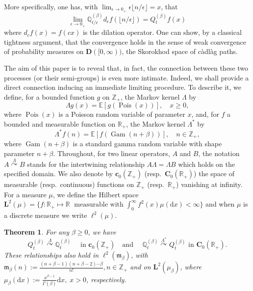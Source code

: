\documentclass[10pt]{amsart}
\newtheorem{theo}{Theorem}[section]
\theoremstyle{definition}\newtheorem{defi}[theo]{Definition}\newtheorem{rema}[theo]{Remark}\newtheorem{exam}[theo]{Example}\newtheorem{exem}[theo]{Example}\newtheorem{nota}[theo]{Notation}
\DeclareMathOperator{\Pois}{Pois}
\DeclareMathOperator{\Gam}{Gam}
\newcommand{\df}{\mathrel{:=}}
\newcommand{\EE}{\mathbb{E}}
\newcommand{\RR}{\mathbb{R}}
\newcommand{\ZZ}{\mathbb{Z}}
\newcommand{\fm}{\mathfrak{m}}
\newcommand{\esL}{\mathbf{L}}
\newcommand{\esC}{\mathbf{C}}
\newcommand{\esc}{\mathbf{c}}
\newcommand*\E{{\mathbb E}}
\newcommand*\R{{\mathbb R}}
\newcommand{\discret}[1]{\mathds{#1}}
\newcommand{\cont}[1]{{#1}}
\newcommand{\adjL}{\Lambda^*}
\newcommand{\Gate}[3]{#1\stackrel{#2}{\curvearrowright}#3}
\newcommand*{\dd}{\mathrm{d}}
\newcommand*{\dx}{\dd x}
\begin{document}
More specifically, one has, with $\lim_{\epsilon \to 0_+} \epsilon{\lfloor n/\epsilon \rfloor}=x$, that
\[
\lim_{\epsilon\to 0_+}\discret{Q}_{t/\epsilon}^{(\beta)} \cont{d}_{\epsilon} f (\lfloor n/\epsilon \rfloor)= \cont{Q}^{(\beta)}_t f(x)
\]
where $\cont{d}_c f(x)=f(cx)$ is the dilation operator. One can show, by a classical tightness argument, that the convergence holds in the sense of weak convergence of probability measures on $\mathbf{D}([0,\infty))$, the Skorokhod space of c\`adl\`ag paths.

The aim of this paper is to reveal that, in fact, the connection between these two processes (or their semi-groups) is even more intimate. Indeed, we shall provide a direct connection inducing an immediate limiting procedure. To describe it, we define, for a bounded function $g$ on $\ZZ_+$, the Markov kernel $\Lambda$ by
\begin{equation}\label{eq:Lambda-def}
\Lambda g (x) = \E\left[g(\Pois(x))\right], \quad x\geq 0,
\end{equation}
where $\Pois(x)$ is a Poisson random variable of parameter $x$, and, for $f$ a bounded and measurable function on $\RR_+$, the Markov kernel $\adjL$ by
\begin{equation}\label{eq:tild-Lambda-def}
\adjL f(n)=\EE[f(\Gam(n+\beta))],\quad n\in \ZZ_+,
\end{equation}
where $\Gam(n+\beta)$ is a standard gamma random variable with shape parameter $n+\beta$. Throughout, for two linear operators, $A$ and $B$, the notation $\Gate{A}{\Lambda}{B}$ stands for the intertwining relationship $A\Lambda=\Lambda B$ which holds on the specified domain. We also denote by $\esc_0(\ZZ_+)$ (resp.~$\esC_0(\RR_+)$) the space of measurable (resp.~continuous) functions on $\ZZ_+$ (resp.~$\RR_+$) vanishing at infinity. For a measure $\mu$, we define the Hilbert space $\esL^2(\mu)=\{f :\RR_+\mapsto \R \; \text{ measurable with } \int_{0}^{\infty}f^2(x) \mu(\dx)<\infty\}$ and when $\mu$ is a discrete measure we write $\ell^2(\mu)$.

\begin{theo}\label{thm:main}
\label{semig}
For any $\beta\geq 0$, we have
\begin{equation}
\Gate{\cont{Q}_t^{(\beta)}}{\Lambda}{\discret{Q}_t^{(\beta)}} \quad \text{ in $\esc_0(\ZZ_+)$ }
\text{ and } \quad
\Gate{\discret{Q}_t^{(\beta)}}{\adjL}{\cont{Q}_t^{(\beta)}} \text{ in $\esC_0(\RR_+)$}.\label{eq:gatewayLag}
\end{equation}
These relationships also hold in $ \ell^2({\fm_{\beta}})$, with $\fm_{\beta}(n)\df \frac{(n+\beta-1)(n+\beta-2)\cdots \beta}{n!}, n\in \ZZ_+$ and on $\esL^2(\mu_{\beta})$, where $\mu_{\beta}(\dx)\df \frac{x^{\beta-1}}{\Gamma(\beta)}\dx, \; x>0$, respectively.
\end{theo}
\end{document}
